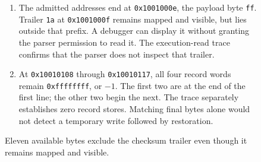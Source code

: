 \begin{figure}[htbp]
\begin{minipage}{\linewidth}
\begin{enumerate}
      \item The admitted addresses end at \texttt{0x1001000e}, the payload byte \texttt{ff}. Trailer \texttt{1a} at \texttt{0x1001000f} remains mapped and visible, but lies outside that prefix. A debugger can display it without granting the parser permission to read it. The execution-read trace confirms that the parser does not inspect that trailer.
      \item At \texttt{0x10010108} through \texttt{0x10010117}, all four record words remain \texttt{0xffffffff}, or $-1$. The first two are at the end of the first line; the other two begin the next. The trace separately establishes zero record stores. Matching final bytes alone would not detect a temporary write followed by restoration.
    \end{enumerate}
  \end{minipage}
  \caption{Eleven available bytes exclude the checksum trailer even though it remains mapped and visible.}
  \label{capture:013-binary-packet-parser-f02-prefix}
  \label{packet-f02-prefix}
\end{figure}
\par
